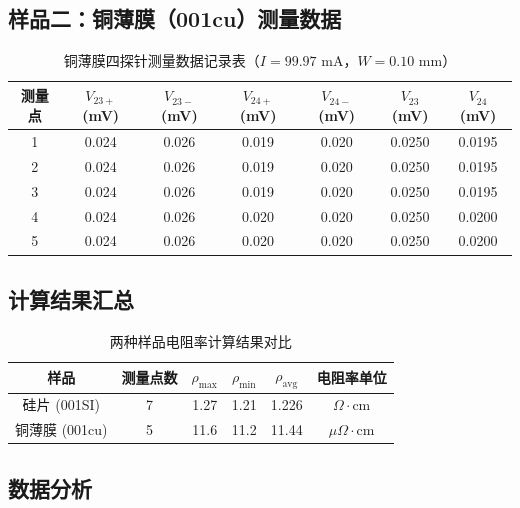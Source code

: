 \subsection{样品二：铜薄膜（001cu）测量数据}

\begin{table}[H]
    \centering
    \caption{铜薄膜四探针测量数据记录表（$I = 99.97$ mA，$W = 0.10$ mm）}
    \begin{tabular}{ccccccc}
        \toprule
        测量点 & $V_{23+}$(mV) & $V_{23-}$(mV) & $V_{24+}$(mV) & $V_{24-}$(mV) & $V_{23}$(mV) & $V_{24}$(mV) \\
        \midrule
        1 & 0.024 & 0.026 & 0.019 & 0.020 & 0.0250 & 0.0195 \\
        2 & 0.024 & 0.026 & 0.019 & 0.020 & 0.0250 & 0.0195 \\
        3 & 0.024 & 0.026 & 0.019 & 0.020 & 0.0250 & 0.0195 \\
        4 & 0.024 & 0.026 & 0.020 & 0.020 & 0.0250 & 0.0200 \\
        5 & 0.024 & 0.026 & 0.020 & 0.020 & 0.0250 & 0.0200 \\
        \bottomrule
    \end{tabular}
\end{table}

\subsection{计算结果汇总}

\begin{table}[H]
    \centering
    \caption{两种样品电阻率计算结果对比}
    \begin{tabular}{cccccc}
        \toprule
        样品 & 测量点数 & $\rho_{\max}$ & $\rho_{\min}$ & $\rho_{\text{avg}}$ & 电阻率单位 \\
        \midrule
        硅片 (001SI) & 7 & 1.27 & 1.21 & 1.226 & $\Omega \cdot \text{cm}$ \\
        铜薄膜 (001cu) & 5 & 11.6 & 11.2 & 11.44 & $\mu\Omega \cdot \text{cm}$ \\
        \bottomrule
    \end{tabular}
\end{table}

\subsection{数据分析}

